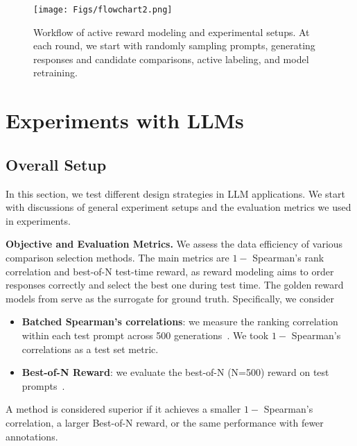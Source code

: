 \begin{figure*}[t!]
    \centering\vspace{-0.1cm}
    \texttt{[image: Figs/flowchart2.png]}\vspace{-0.25cm}
    \caption{\small Workflow of active reward modeling and experimental setups. At each round, we start with randomly sampling prompts, generating responses and candidate comparisons, active labeling, and model retraining. }\vspace{-0.25cm}
    \label{fig:flow_chart}
\end{figure*}
\section{Experiments with LLMs}
\subsection{Overall Setup} In this section, we test different design strategies in LLM applications. We start with discussions of general experiment setups and the evaluation metrics we used in experiments.

\textbf{Objective and Evaluation Metrics.}  We assess the data efficiency of various comparison selection methods. The main metrics are $1-$ Spearman's rank correlation and best-of-N test-time reward, as reward modeling aims to order responses correctly and select the best one during test time. The golden reward models from \citet{dong2024rlhf} serve as the surrogate for ground truth. Specifically, we consider
\begin{itemize}[nosep,leftmargin=*]
    \item \textbf{Batched Spearman's correlations}: we measure the ranking correlation within each test prompt across 500 generations~\citep{sun2024rethinking}. We took $1-$ Spearman's correlations as a test set metric. 
    \item \textbf{Best-of-N Reward}: we evaluate the best-of-N (N=500) reward on test prompts~\citep{gao2023scaling,gui2024bonbon}.
\end{itemize}
A method is considered superior if it achieves a smaller $1-$ Spearman's correlation, a larger Best-of-N reward, or the same performance with fewer annotations.



